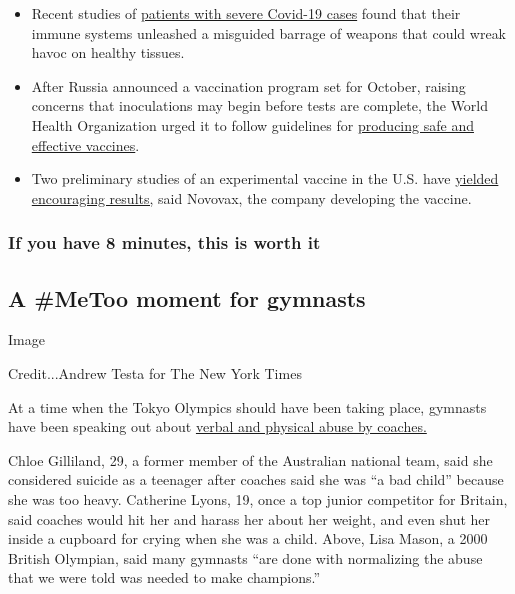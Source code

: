 \begin{itemize}
\item
  Recent studies of
  \href{https://www.nytimes3xbfgragh.onion/2020/08/04/health/coronavirus-immune-system.html}{patients
  with severe Covid-19 cases} found that their immune systems unleashed
  a misguided barrage of weapons that could wreak havoc on healthy
  tissues.
\item
  After Russia announced a vaccination program set for October, raising
  concerns that inoculations may begin before tests are complete, the
  World Health Organization urged it to follow guidelines for
  \href{https://www.nytimes3xbfgragh.onion/2020/08/04/world/coronavirus-covid-19.html?action=click\&module=Top\%20Stories\&pgtype=Homepage\#link-7bfa12a5}{producing
  safe and effective vaccines}.
\item
  Two preliminary studies of an experimental vaccine in the U.S. have
  \href{https://www.nytimes3xbfgragh.onion/2020/08/04/world/coronavirus-cases.html?action=click\&module=Top\%20Stories\&pgtype=Homepage\#link-1228a480}{yielded
  encouraging results,} said Novovax, the company developing the
  vaccine.
\end{itemize}

\hypertarget{if-you-have-8-minutes-this-is-worth-it}{%
\subsubsection{If you have 8 minutes, this is worth
it}\label{if-you-have-8-minutes-this-is-worth-it}}

\hypertarget{a-metoo-moment-for-gymnasts}{%
\subsection{A \#MeToo moment for
gymnasts}\label{a-metoo-moment-for-gymnasts}}

Image

Credit...Andrew Testa for The New York Times

At a time when the Tokyo Olympics should have been taking place,
gymnasts have been speaking out about
\href{https://www.nytimes3xbfgragh.onion/2020/08/03/sports/olympics/gymnastics-abuse-athlete-a.html}{verbal
and physical abuse by coaches.}

Chloe Gilliland, 29, a former member of the Australian national team,
said she considered suicide as a teenager after coaches said she was ``a
bad child'' because she was too heavy. Catherine Lyons, 19, once a top
junior competitor for Britain, said coaches would hit her and harass her
about her weight, and even shut her inside a cupboard for crying when
she was a child. Above, Lisa Mason, a 2000 British Olympian, said many
gymnasts ``are done with normalizing the abuse that we were told was
needed to make champions.''

